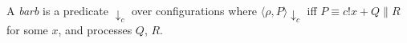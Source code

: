 


\begin{definition}[Barb]
	A \emph{barb} is a predicate $\downarrow_{c}$ over configurations where $\langle \rho, P \rangle \downarrow_{c}$ iff $P \equiv c!x + Q \parallel R$ for some $x$, and processes $Q$, $R$.
\end{definition}



